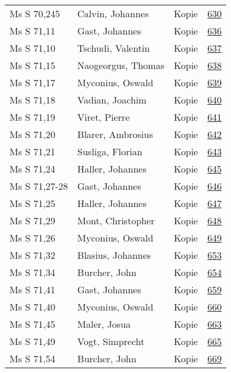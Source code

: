 \documentclass[10pt,a4paper,landscape]{report}
\begin{document}
\begin{longtable}{p{16cm}p{4cm}lr}
Ms S 70,245	&	Calvin, Johannes	&	Kopie	&	\href{http://130.60.24.72/assignment/630}{630}\\
Ms S 71,11	&	Gast, Johannes	&	Kopie	&	\href{http://130.60.24.72/assignment/636}{636}\\
Ms S 71,10	&	Tschudi, Valentin	&	Kopie	&	\href{http://130.60.24.72/assignment/637}{637}\\
Ms S 71,15	&	Naogeorgus, Thomas	&	Kopie	&	\href{http://130.60.24.72/assignment/638}{638}\\
Ms S 71,17	&	Myconius, Oswald	&	Kopie	&	\href{http://130.60.24.72/assignment/639}{639}\\
Ms S 71,18	&	Vadian, Joachim	&	Kopie	&	\href{http://130.60.24.72/assignment/640}{640}\\
Ms S 71,19	&	Viret, Pierre	&	Kopie	&	\href{http://130.60.24.72/assignment/641}{641}\\
Ms S 71,20	&	Blarer, Ambrosius	&	Kopie	&	\href{http://130.60.24.72/assignment/642}{642}\\
Ms S 71,21	&	Susliga, Florian	&	Kopie	&	\href{http://130.60.24.72/assignment/643}{643}\\
Ms S 71,24	&	Haller, Johannes	&	Kopie	&	\href{http://130.60.24.72/assignment/645}{645}\\
Ms S 71,27-28	&	Gast, Johannes	&	Kopie	&	\href{http://130.60.24.72/assignment/646}{646}\\
Ms S 71,25	&	Haller, Johannes	&	Kopie	&	\href{http://130.60.24.72/assignment/647}{647}\\
Ms S 71,29	&	Mont, Christopher	&	Kopie	&	\href{http://130.60.24.72/assignment/648}{648}\\
Ms S 71,26	&	Myconius, Oswald	&	Kopie	&	\href{http://130.60.24.72/assignment/649}{649}\\
Ms S 71,32	&	Blasius, Johannes	&	Kopie	&	\href{http://130.60.24.72/assignment/653}{653}\\
Ms S 71,34	&	Burcher, John	&	Kopie	&	\href{http://130.60.24.72/assignment/654}{654}\\
Ms S 71,41	&	Gast, Johannes	&	Kopie	&	\href{http://130.60.24.72/assignment/659}{659}\\
Ms S 71,40	&	Myconius, Oswald	&	Kopie	&	\href{http://130.60.24.72/assignment/660}{660}\\
Ms S 71,45	&	Maler, Josua	&	Kopie	&	\href{http://130.60.24.72/assignment/663}{663}\\
Ms S 71,49	&	Vogt, Simprecht	&	Kopie	&	\href{http://130.60.24.72/assignment/665}{665}\\
Ms S 71,54	&	Burcher, John	&	Kopie	&	\href{http://130.60.24.72/assignment/669}{669}\\

\end{longtable}
\end{document}
